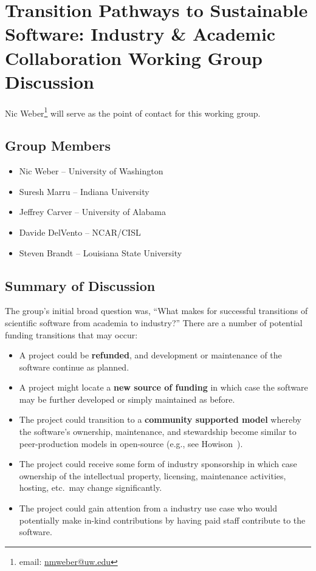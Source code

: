 \section{Transition Pathways to Sustainable Software: Industry \& Academic Collaboration Working Group Discussion}
\label{sec:appendix_industry_interaction}

Nic Weber\footnote{email: \href{mailto:nmweber@uw.edu}{nmweber@uw.edu}} will
serve as the point of contact for this working group.

\subsection{Group Members}

\begin{itemize}
\item Nic Weber -- University of Washington
\item Suresh Marru -- Indiana University
\item Jeffrey Carver -- University of Alabama
\item Davide DelVento -- NCAR/CISL
\item Steven Brandt -- Louisiana State University
\end{itemize} 

\subsection{Summary of Discussion}

The group's initial broad question was, ``What makes for successful transitions of
scientific software from academia to industry?'' There are a number of potential
funding transitions that may occur:
%
\begin{itemize}

\item A project could be \textbf{refunded}, and development or maintenance of
the software continue as planned.

\item A project might locate a \textbf{new source of funding} in which case the
software may be further developed or simply maintained as before.

\item The project could transition to a \textbf{community supported model}
whereby the software's ownership, maintenance, and stewardship  become similar
to peer-production models in open-source (e.g., see
Howison~\cite{howison_sustaining_2015}).

\item The project could receive some form of industry sponsorship in which case
ownership of the intellectual property, licensing, maintenance activities,
hosting, etc.\ may change significantly.

\item The project could gain attention from a industry use case who would
potentially make in-kind contributions by having paid staff contribute to the
software.

\end{itemize}

